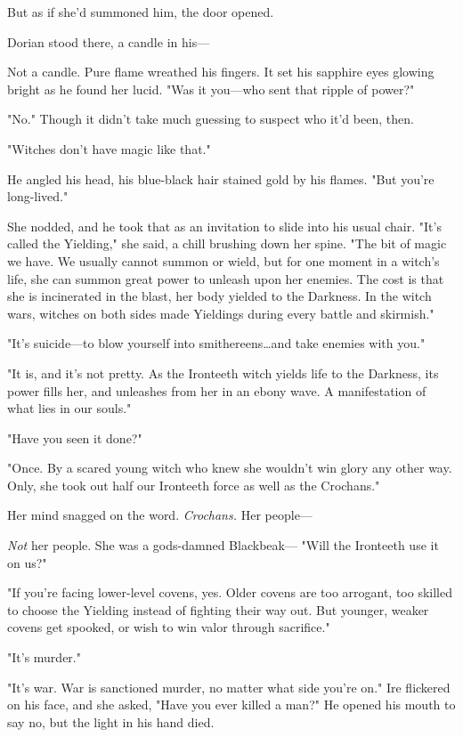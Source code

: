 But as if she'd summoned him, the door opened.

Dorian stood there, a candle in his---

Not a candle.
Pure flame wreathed his fingers.
It set his sapphire eyes glowing bright as he found her lucid.
"Was it you---who sent that ripple of power?"

"No."
Though it didn't take much guessing to suspect who it'd been, then.

"Witches don't have magic like that."

He angled his head, his blue-black hair stained gold by his flames.
"But you're long-lived."

She nodded, and he took that as an invitation to slide into his usual chair.
"It's called the Yielding," she said, a chill brushing down her spine.
"The bit of magic we have.
We usually cannot summon or wield, but for one moment in a witch's life, she can summon great power to unleash upon her enemies.
The cost is that she is incinerated in the blast, her body yielded to the Darkness.
In the witch wars, witches on both sides made Yieldings during every battle and skirmish."

"It's suicide---to blow yourself into smithereens\ldots and take enemies with you."

"It is, and it's not pretty.
As the Ironteeth witch yields life to the Darkness, its power fills her, and unleashes from her in an ebony wave.
A manifestation of what lies in our souls."

"Have you seen it done?"

"Once.
By a scared young witch who knew she wouldn't win glory any other way.
Only, she took out half our Ironteeth force as well as the Crochans."

Her mind snagged on the word.
\emph{Crochans.} Her people---

\emph{Not} her people.
She was a gods-damned Blackbeak--- "Will the Ironteeth use it on us?"

"If you're facing lower-level covens, yes.
Older covens are too arrogant, too skilled to choose the Yielding instead of fighting their way out.
But younger, weaker covens get spooked, or wish to win valor through sacrifice."

"It's murder."

"It's war.
War is sanctioned murder, no matter what side you're on."
Ire flickered on his face, and she asked, "Have you ever killed a man?"
He opened his mouth to say no, but the light in his hand died.

